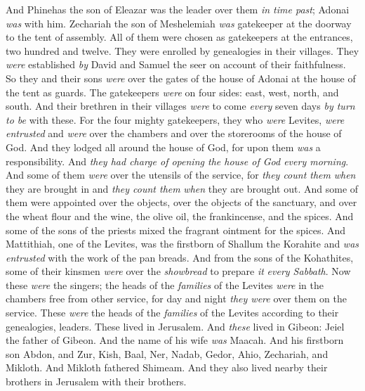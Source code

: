 \begin{biblechapter}
\verse And Phinehas the son of Eleazar was the leader over them \textit{in time past}; Adonai \textit{was} with him.
\verse Zechariah the son of Meshelemiah \textit{was} gatekeeper at the doorway to the tent of assembly.
\verse All of them were chosen as gatekeepers at the entrances, two hundred and twelve. They were enrolled by genealogies in their villages. They \textit{were} established \textit{by} David and Samuel the seer on account of their faithfulness.
\verse So they and their sons \textit{were} over the gates of the house of Adonai at the house of the tent as guards.
\verse The gatekeepers \textit{were} on four sides: east, west, north, and south.
\verse And their brethren in their villages \textit{were} to come \textit{every} seven days \textit{by turn} \textit{to be} with these.
\verse For the four mighty gatekeepers, they who \textit{were} Levites, \textit{were entrusted} and \textit{were} over the chambers and over the storerooms of the house of God.
\verse And they lodged all around the house of God, for upon them \textit{was} a responsibility. And \textit{they had charge of opening \textit{the house of God} every morning}.
\verse And some of them \textit{were} over the utensils of the service, for \textit{they count them} \textit{when} they are brought in and \textit{they count them} \textit{when} they are brought out.
\verse And some of them were appointed over the objects, over the objects of the sanctuary, and over the wheat flour and the wine, the olive oil, the frankincense, and the spices.
\verse And some of the sons of the priests mixed the fragrant ointment for the spices.
\verse And Mattithiah, one of the Levites, was the firstborn of Shallum the Korahite and \textit{was entrusted} with the work of the pan breads.
\verse And from the sons of the Kohathites, some of their kinsmen \textit{were} over the \textit{showbread} to prepare \textit{it} \textit{every Sabbath}.
\verse Now these \textit{were} the singers; the heads of the \textit{families} of the Levites \textit{were} in the chambers free from other service, for day and night \textit{they were} over them on the service.
\verse These \textit{were} the heads of the \textit{families} of the Levites according to their genealogies, leaders. These lived in Jerusalem.
 And \textit{these} lived in Gibeon: Jeiel the father of Gibeon. And the name of his wife \textit{was} Maacah.
\verse And his firstborn son Abdon, and Zur, Kish, Baal, Ner, Nadab,
\verse Gedor, Ahio, Zechariah, and Mikloth.
\verse And Mikloth fathered Shimeam. And they also lived nearby their brothers in Jerusalem with their brothers.

\end{biblechapter}
